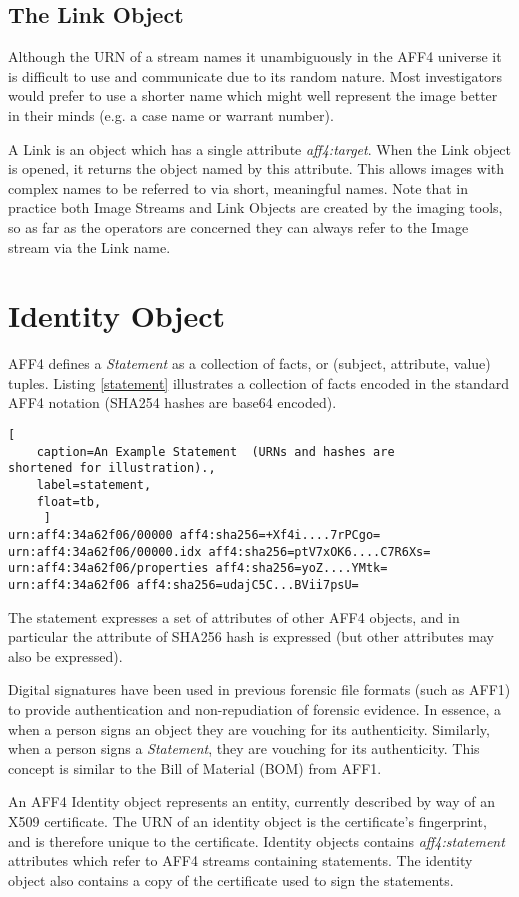 \documentclass[10pt, conference]{IEEEtran}
\begin{document}
\subsection{The Link Object}
Although the URN of a stream names it unambiguously in the AFF4
universe it is difficult to use and communicate due to its random
nature. Most investigators would prefer to use a shorter name which
might well represent the image better in their minds (e.g. a case
name or warrant number).

A Link is an object which has a single attribute
\emph{aff4:target}. When the Link object is opened, it returns the
object named by this attribute. This allows images with complex names
to be referred to via short, meaningful names. Note that in practice
both Image Streams and Link Objects are created by the imaging tools,
so as far as the operators are concerned they can always refer to the
Image stream via the Link name.

\section{Identity Object}
AFF4 defines a \emph{Statement} as a collection of facts, or
(subject, attribute, value) tuples. Listing \ref{statement}
illustrates a collection of facts encoded in the standard AFF4
notation (SHA254 hashes are base64 encoded).

\begin{lstlisting}[
	caption=An Example Statement  (URNs and hashes are
shortened for illustration).,
	label=statement,
	float=tb,
	 ]
urn:aff4:34a62f06/00000 aff4:sha256=+Xf4i....7rPCgo=
urn:aff4:34a62f06/00000.idx aff4:sha256=ptV7xOK6....C7R6Xs=
urn:aff4:34a62f06/properties aff4:sha256=yoZ....YMtk=
urn:aff4:34a62f06 aff4:sha256=udajC5C...BVii7psU=
\end{lstlisting}

The statement expresses a set of attributes of other AFF4 objects, and
in particular the attribute of SHA256 hash is expressed (but other
attributes may also be expressed).

Digital signatures have been used in previous forensic file formats
(such as AFF1) to provide authentication and non-repudiation of
forensic evidence. In essence, a when a person signs an object they
are vouching for its authenticity. Similarly, when a person signs a
\emph{Statement}, they are vouching for its authenticity. This concept
is similar to the Bill of Material (BOM) from AFF1.

An AFF4 Identity object represents an entity, currently described by
way of an X509 certificate. The URN of an identity object is the
certificate's fingerprint, and is therefore unique to the
certificate. Identity objects contains \emph{aff4:statement}
attributes which refer to AFF4 streams containing statements. The
identity object also contains a copy of the certificate used to sign
the statements.
\end{document}
